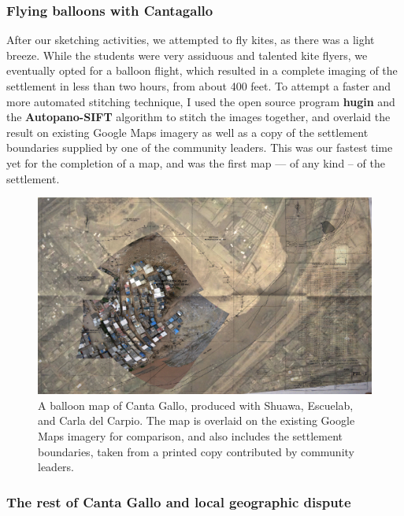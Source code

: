 \documentclass[11pt,oneside,notitlepage]{report}
\begin{document}
\subsubsection{Flying balloons with Cantagallo}

After our sketching activities, we attempted to fly kites, as there was a light breeze. While the students were very assiduous and talented kite flyers, we eventually opted for a balloon flight, which resulted in a complete imaging of the settlement in less than two hours, from about 400 feet. To attempt a faster and more automated stitching technique, I used the open source program \textbf{hugin} and the \textbf{Autopano-SIFT} algorithm to stitch the images together, and overlaid the result on existing Google Maps imagery as well as a copy of the settlement boundaries supplied by one of the community leaders. This was our fastest time yet for the completion of a map, and was the first map --- of any kind -- of the settlement. 

\begin{figure}[h]
  \begin{center}
	\includegraphics[width=1\textwidth]{images/cantagallo-initial.jpg}
	\caption{A balloon map of Canta Gallo, produced with Shuawa, Escuelab, and Carla del Carpio. The map is overlaid on the existing Google Maps imagery for comparison, and also includes the settlement boundaries, taken from a printed copy contributed by community leaders.}
  \end{center}
\end{figure}

\subsubsection{The rest of Canta Gallo and local geographic dispute}
\end{document}
